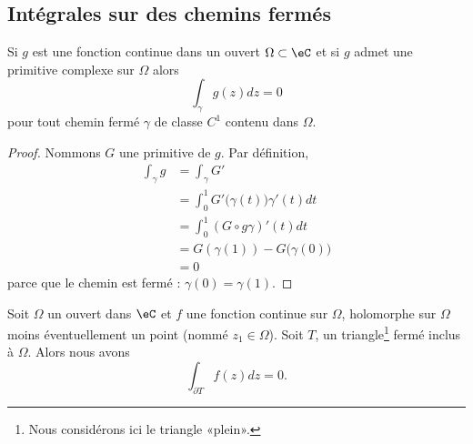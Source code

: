 \subsection{Intégrales sur des chemins fermés}

\begin{lemma}       \label{LemtpEOmi}
    Si \( g\) est une fonction continue dans un ouvert \( \Omega\subset \eC\) et si \( g\) admet une primitive complexe sur \( \Omega\) alors 
    \begin{equation}
        \int_{\gamma}g(z)dz=0
    \end{equation}
    pour tout chemin fermé \( \gamma\) de classe \( C^1\) contenu dans \( \Omega\).
\end{lemma}

\begin{proof}
    Nommons \( G\) une primitive de \( g\). Par définition,
    \begin{subequations}
        \begin{align}
            \int_{\gamma}g&=\int_{\gamma}G'\\
            &=\int_0^1G'\big( \gamma(t) \big)\gamma'(t)dt\\
            &=\int_0^1 (G\circ g\gamma)'(t)dt\\
            &=G(\gamma(1))-G\big( \gamma(0) \big)\\
            &=0
        \end{align}
    \end{subequations}
    parce que le chemin est fermé : \( \gamma(0)=\gamma(1)\).
\end{proof}

\begin{lemma}  \label{LemwbwbUR}
    Soit \( \Omega\) un ouvert dans \( \eC\) et \( f\) une fonction continue sur \( \Omega\), holomorphe sur \( \Omega\) moins éventuellement un point (nommé \( z_1\in\Omega\)). Soit \( T\), un triangle\footnote{Nous considérons ici le triangle «plein».} fermé inclus à \( \Omega\). Alors nous avons
    \begin{equation}
        \int_{\partial T}f(z)dz=0.
    \end{equation}
\end{lemma}

